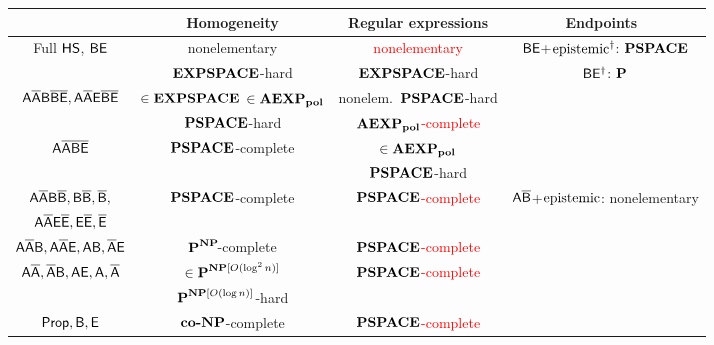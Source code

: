 \begingroup
\renewcommand*{\arraystretch}{1.3}
%
\begin{tabular}{|@{\ }c@{\ }|@{\ }c@{\ }|@{\ }c@{\ }||@{\ }c@{\ }|}
\hline 
 & Homogeneity & Regular expressions & Endpoints~\cite{LM13,LM14,lm16}\\
\hline \hline 
\multirow{2}{*}{Full $\HS$, $\B\E$} & nonelementary  & \textcolor{red}{nonelementary}  & $\B\E$+$\epist^\dagger$: $\Psp$ \\
 & $\EXPSPACE$-hard & $\EXPSPACE$-hard & $\B\E^\dagger$: $\PTIME$\\
\hline 
\multirow{2}{*}{$\A\Abar\B\Bbar\Ebar,\A\Abar\E\Bbar\Ebar$} & $\in\EXPSPACE$ \textcolor{red}{$\in\LINAEXPTIME$}& nonelem.\  $\Psp$-hard &\\
 & $\Psp$-hard & \textcolor{red}{$\LINAEXPTIME$-complete}& \\
\hline 
\multirow{2}{*}{$\AAbar\Bbar\Ebar$} & \multirow{2}{*}{$\Psp$-complete} & \textcolor{red}{$\in\LINAEXPTIME$} & \\
 & & $\Psp$-hard & \\
\hline
$\AAbarBBbar,\B\Bbar,\Bbar,$ & \multirow{2}{*}{$\Psp$-complete} & \multirow{2}{*}{\textcolor{red}{$\Psp$-complete}} & \multirow{2}{*}{$\A\Bbar$+$\epist$: nonelementary}\\
$\AAbarEEbar,\E\Ebar,\Ebar$ & & & \\
\hline 
$\AAbar\B,\AAbar\E,\A\B,\Abar\E$ & $\PTIME^{\NP}\!$-complete & \textcolor{red}{$\Psp$-complete} & \\
\hline 
\multirow{2}{*}{$\A\Abar,\Abar\B,\A\E,\A,\Abar$} & $\in\Thsq$ & \multirow{2}{*}{\textcolor{red}{$\Psp$-complete}} & \\
 & $\Th$-hard &  & \\
\hline 
$\HSprop, \B,\E$ & $\co\NP$-complete & \textcolor{red}{$\Psp$-complete} & \\
\hline 
\end{tabular}

\endgroup